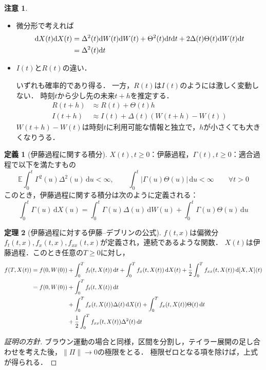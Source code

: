 \documentclass[a4paper, lualatex, ja=standard]{bxjsarticle}
\theoremstyle{definition}
\newtheorem{thm}{定理}[subsection]
\newtheorem{dfn}[thm]{定義}
\newtheorem*{note*}{注意}
\newcommand{\E}{\mathbb{E}}
\newcommand{\diff}{\mathrm{d}}
\begin{document}
\begin{note*}
  \begin{itemize}
    \item 
    微分形で考えれば
    \begin{align}
      \diff X(t)\diff X(t) &= \Delta^2(t)\diff W(t)\diff W(t) + \Theta^2(t)\diff t\diff t + 2\Delta(t)\Theta(t)\diff W(t)\diff t \notag\\
      &= \Delta^2(t)\diff t
    \end{align}

    \item $I(t)$と$R(t)$の違い．
    
    いずれも確率的であり得る．
    一方，$R(t)$は$I(t)$のようには激しく変動しない．
    時刻$t$から少し先の未来$t+h$を推定する．
    \begin{align*}
      R(t+h) &\approx R(t) + \Theta(t)h\\
      I(t+h) &\approx I(t) + \Delta(t)(W(t+h)-W(t))
    \end{align*}
    $W(t+h)-W(t)$は時刻$t$に利用可能な情報と独立で，$h$が小さくても大きくなりうる．
  \end{itemize}
\end{note*}

\begin{dfn}[伊藤過程に関する積分]
  $X(t),t\geq0$：伊藤過程，$\Gamma(t),t\geq0$：適合過程で以下を満たすもの
  \begin{equation*}
    \E\int_0^t\Gamma^2(u)\Delta^2(u)\,\diff u<\infty,\qquad
    \int_0^t|\Gamma(u)\Theta(u)|\,\diff u<\infty\qquad \forall t>0
  \end{equation*}
  このとき，伊藤過程に関する積分は次のように定義される：
  \begin{equation}
    \int_0^t\Gamma(u)\,\diff X(u) = \int_0^t\Gamma(u)\Delta(u)\,\diff W(u) + \int_0^t\Gamma(u)\Theta(u)\,\diff u
  \end{equation}
\end{dfn}

\begin{thm}[伊藤過程に対する伊藤--デブリンの公式]
  $f(t,x)$は偏微分$f_t(t,x),f_x(t,x),f_{xx}(t,x)$が定義され，連続であるような関数．
  $X(t)$は伊藤過程．このとき任意の$T\geq0$に対し，
  \begin{align}
    f(T,X(t)) = f(0,W(0)) &+ \int_0^T f_t(t,X(t))\,\diff t + \int_0^T f_x(t,X(t))\,\diff X(t)+ \frac{1}{2}\int_0^T f_{xx}(t,X(t))\,\diff [X,X](t)\notag\\
    = f(0,W(0)) &+ \int_0^T f_t(t,X(t))\,\diff t \notag\\
    &+ \int_0^T f_x(t,X(t))\Delta(t)\,\diff X(t) + \int_0^T f_x(t,X(t))\Theta(t)\,\diff t \notag\\
    &+ \frac{1}{2}\int_0^T f_{xx}(t,X(t))\Delta^2(t)\,\diff t
  \end{align}
\end{thm}
\begin{proof}[証明の方針]
  ブラウン運動の場合と同様，区間を分割し，テイラー展開の足し合わせを考えた後，$\|\Pi\|\to0$の極限をとる．
  極限ゼロとなる項を除けば，上式が得られる．
\end{proof}
\end{document}
